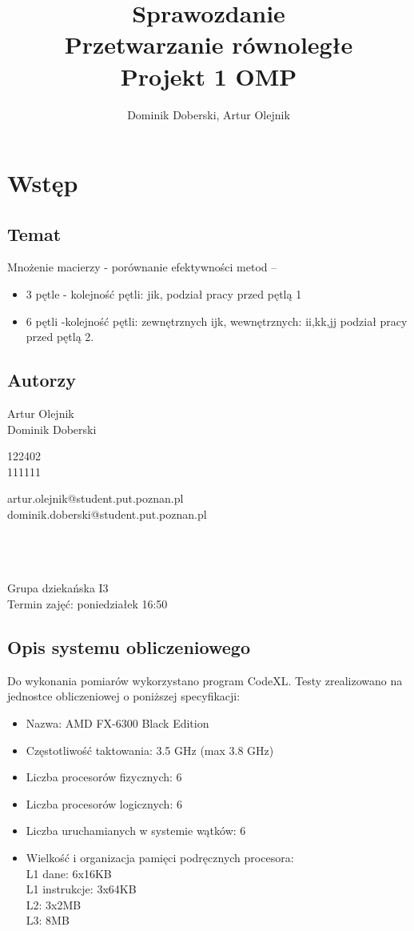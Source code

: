 \documentclass{article}
\author{Dominik Doberski, Artur Olejnik}
\title{\huge Sprawozdanie \\ Przetwarzanie równoległe\\ \Huge Projekt 1 OMP
}
\begin{document}
\maketitle

\section{Wstęp}
\subsection{Temat}
Mnożenie macierzy - porównanie efektywności metod --
\begin{itemize}
\item 3 pętle - kolejność pętli: jik, podział pracy przed pętlą 1
\item 6 pętli -kolejność pętli: zewnętrznych ijk, wewnętrznych: ii,kk,jj podział pracy przed pętlą 2.
\end{itemize}
\subsection{Autorzy}
\begin{minipage}[t]{0.3\textwidth}
Artur Olejnik\\
Dominik Doberski
\end{minipage}
\begin{minipage}[t]{0.15\textwidth}
122402\\
111111
\end{minipage}
\begin{minipage}[t]{0.55\textwidth}
artur.olejnik@student.put.poznan.pl\\
dominik.doberski@student.put.poznan.pl
\end{minipage}
\\\\\\
Grupa dziekańska I3\\
Termin zajęć: poniedziałek 16:50 
\subsection{Opis systemu obliczeniowego}
Do wykonania pomiarów wykorzystano program CodeXL. Testy zrealizowano na jednostce obliczeniowej o poniższej specyfikacji:
\begin{itemize}
\item Nazwa: AMD FX-6300 Black Edition
\item Częstotliwość taktowania: 3.5 GHz (max 3.8 GHz)
\item Liczba procesorów fizycznych: 6
\item Liczba procesorów logicznych: 6
\item Liczba uruchamianych w systemie wątków: 6
\item Wielkość i organizacja pamięci podręcznych procesora:\\
L1 dane: 6x16KB\\
L1 instrukcje: 3x64KB\\
L2: 3x2MB\\
L3: 8MB\\
\end{itemize}
\end{document}
